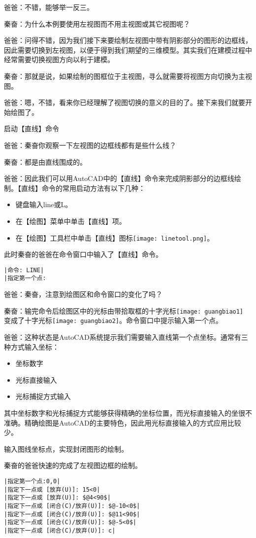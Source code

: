\begin{procedure}
爸爸：不错，能够举一反三。

秦奋：为什么本例要使用左视图而不用主视图或其它视图呢？

爸爸：问得不错，因为我们接下来要绘制左视图中带有阴影部分的图形的边框线，因此需要切换到左视图，以便于得到我们期望的三维模型。其实我们在建模过程中经常需要切换视图方向以利于建模。

秦奋：那就是说，如果绘制的图框位于主视图，寻么就需要将视图方向切换为主视图。

爸爸：嗯，不错，看来你已经理解了视图切换的意义的目的了。接下来我们就要开始绘图了。
\item 启动【直线】命令

爸爸：秦奋你观察一下左视图的边框线都有是些什么线？

秦奋：都是由直线围成的。

爸爸：因此我们可以用AutoCAD中的【直线】命令来完成阴影部分的边框线绘制。【直线】命令的常用启动方法有以下几种：
\begin{itemize}
\item 键盘输入line或L。
\item 在【绘图】菜单中单击【直线】项。
\item 在【绘图】工具栏中单击【直线】图标\texttt{[image: linetool.png]}。
\end{itemize}
此时秦奋的爸爸在命令窗口中输入了【直线】命令。
\begin{lstlisting}
|命令: LINE|
|指定第一个点:
\end{lstlisting}
爸爸：秦奋，注意到绘图区和命令窗口的变化了吗？

秦奋：输完命令后绘图区中的光标由带拾取框的十字光标\texttt{[image: guangbiao1]} 变成了十字光标\texttt{[image: guangbiao2]}。命令窗口中提示输入第一个点。

爸爸：这种状态是AutoCAD系统提示我们需要输入直线第一个点坐标。通常有三种方式输入坐标：
\begin{itemize}
\item 坐标数字
\item 光标直接输入
\item 光标捕捉方式输入
\end{itemize}

其中坐标数字和光标捕捉方式能够获得精确的坐标位置，而光标直接输入的坐很不准确。精确绘图是AutoCAD的主要特色，因此用光标直接输入的方式应用比较少。
\item 输入图线坐标点，实现封闭图形的绘制。

秦奋的爸爸快速的完成了左视图边框的绘制。
\begin{lstlisting}
|指定第一个点:0,0|
|指定下一点或 [放弃(U)]: 15<0|
|指定下一点或 [放弃(U)]: $@4<90$|
|指定下一点或 [闭合(C)/放弃(U)]: $@-10<0$|
|指定下一点或 [闭合(C)/放弃(U)]: $@11<90$|
|指定下一点或 [闭合(C)/放弃(U)]: $@-5<0$|
|指定下一点或 [闭合(C)/放弃(U)]: c|
\end{lstlisting}


\end{procedure}

